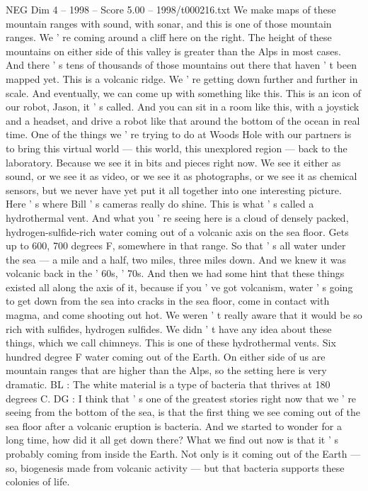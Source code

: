 \begin{textsample}{NEG Dim 4 – 1998 – Score 5.00 – 1998/t000216.txt}
We make maps of these mountain ranges with sound, with sonar, and this is one of those mountain ranges.
We ' re coming around a cliff here on the right.
The height of these mountains on either side of this valley is greater than the Alps in most cases.
And there ' s tens of thousands of those mountains out there that haven ' t been mapped yet.
This is a volcanic ridge.
We ' re getting down further and further in scale.
And eventually, we can come up with something like this.
This is an icon of our robot, Jason, it ' s called.
And you can sit in a room like this, with a joystick and a headset, and drive a robot like that around the bottom of the ocean in real time.
One of the things we ' re trying to do at Woods Hole with our partners is to bring this virtual world — this world, this unexplored region — back to the laboratory.
Because we see it in bits and pieces right now.
We see it either as sound, or we see it as video, or we see it as photographs, or we see it as chemical sensors, but we never have yet put it all together into one interesting picture.
Here ' s where Bill ' s cameras really do shine.
This is what ' s called a hydrothermal vent.
And what you ' re seeing here is a cloud of densely packed, hydrogen-sulfide-rich water coming out of a volcanic axis on the sea floor.
Gets up to 600, 700 degrees F, somewhere in that range.
So that ' s all water under the sea — a mile and a half, two miles, three miles down.
And we knew it was volcanic back in the ' 60s, ' 70s.
And then we had some hint that these things existed all along the axis of it, because if you ' ve got volcanism, water ' s going to get down from the sea into cracks in the sea floor, come in contact with magma, and come shooting out hot.
We weren ' t really aware that it would be so rich with sulfides, hydrogen sulfides.
We didn ' t have any idea about these things, which we call chimneys.
This is one of these hydrothermal vents.
Six hundred degree F water coming out of the Earth.
On either side of us are mountain ranges that are higher than the Alps, so the setting here is very dramatic.
BL : The white material is a type of bacteria that thrives at 180 degrees C.
DG : I think that ' s one of the greatest stories right now that we ' re seeing from the bottom of the sea, is that the first thing we see coming out of the sea floor after a volcanic eruption is bacteria.
And we started to wonder for a long time, how did it all get down there?
What we find out now is that it ' s probably coming from inside the Earth.
Not only is it coming out of the Earth — so, biogenesis made from volcanic activity — but that bacteria supports these colonies of life.

\end{textsample}
